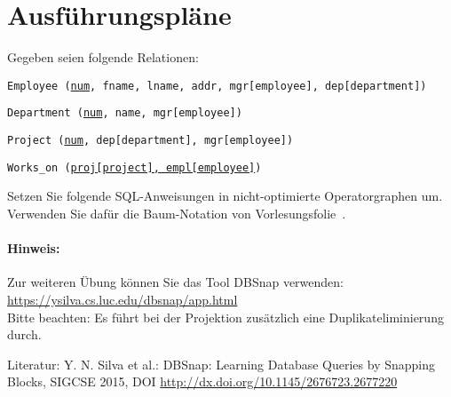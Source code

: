\section{Ausführungspläne}
\label{plan}

Gegeben seien folgende Relationen:

\texttt{Employee (\underline{num}, fname, lname, addr, mgr[employee], \beamertxt{\\}dep[department])}

\texttt{Department (\underline{num}, name, mgr[employee])}

\texttt{Project (\underline{num}, dep[department], mgr[employee])}

\texttt{Works\_on (\underline{proj[project], empl[employee]})}

Setzen Sie folgende SQL-Anweisungen in nicht-optimierte Operatorgraphen um. Verwenden Sie dafür die Baum-Notation von Vorlesungsfolie~\Operatorgraph. %

\paragraph{Hinweis:} Zur weiteren Übung können Sie das Tool DBSnap verwenden: \\
	\url{https://ysilva.cs.luc.edu/dbsnap/app.html} \\
	Bitte beachten: Es führt bei der Projektion zusätzlich eine Duplikateliminierung durch.

	\begin{note}
		Literatur: Y. N. Silva et al.: DBSnap: Learning Database Queries by Snapping Blocks, SIGCSE 2015, DOI \url{http://dx.doi.org/10.1145/2676723.2677220}
	\end{note}

